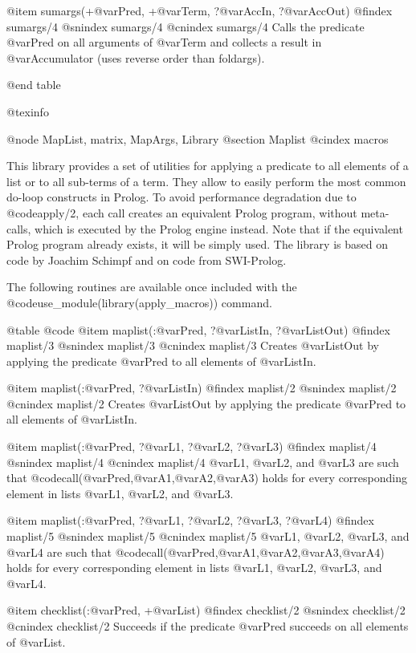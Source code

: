 @item sumargs(+@var{Pred}, +@var{Term}, ?@var{AccIn}, ?@var{AccOut})
@findex sumargs/4
@snindex sumargs/4
@cnindex sumargs/4
  Calls the predicate @var{Pred} on all arguments of @var{Term} and
collects a  result in @var{Accumulator} (uses reverse order than foldargs).

@end table

@texinfo


@node MapList, matrix, MapArgs, Library
@section Maplist
@cindex macros

This library provides a set of utilities for applying a predicate to
all elements of a list or to all sub-terms of a term. They allow to
easily perform the most common do-loop constructs in Prolog. To avoid
performance degradation due to @code{apply/2}, each call creates an
equivalent Prolog program, without meta-calls, which is executed by
the Prolog engine instead. Note that if the equivalent Prolog program
already exists, it will be simply used. The library is based on code
by Joachim Schimpf and on code from SWI-Prolog.

The following routines are available once included with the
@code{use_module(library(apply_macros))} command.

@table @code
@item maplist(:@var{Pred}, ?@var{ListIn}, ?@var{ListOut})
@findex maplist/3
@snindex maplist/3
@cnindex maplist/3
      Creates @var{ListOut} by applying the predicate @var{Pred} to all
elements of @var{ListIn}.

@item maplist(:@var{Pred}, ?@var{ListIn})
@findex maplist/2
@snindex maplist/2
@cnindex maplist/2
      Creates @var{ListOut} by applying the predicate @var{Pred} to all
elements of @var{ListIn}.

@item maplist(:@var{Pred}, ?@var{L1}, ?@var{L2}, ?@var{L3})
@findex maplist/4
@snindex maplist/4
@cnindex maplist/4
      @var{L1},  @var{L2}, and @var{L3} are such that
      @code{call(@var{Pred},@var{A1},@var{A2},@var{A3})} holds for every
      corresponding element in lists @var{L1},  @var{L2}, and @var{L3}.

@item maplist(:@var{Pred}, ?@var{L1}, ?@var{L2}, ?@var{L3}, ?@var{L4})
@findex maplist/5
@snindex maplist/5
@cnindex maplist/5
      @var{L1}, @var{L2}, @var{L3}, and @var{L4} are such that
      @code{call(@var{Pred},@var{A1},@var{A2},@var{A3},@var{A4})} holds
      for every corresponding element in lists @var{L1}, @var{L2}, @var{L3}, and
      @var{L4}.

@item checklist(:@var{Pred}, +@var{List})
@findex checklist/2
@snindex checklist/2
@cnindex checklist/2
      Succeeds if the predicate @var{Pred} succeeds on all elements of @var{List}.

